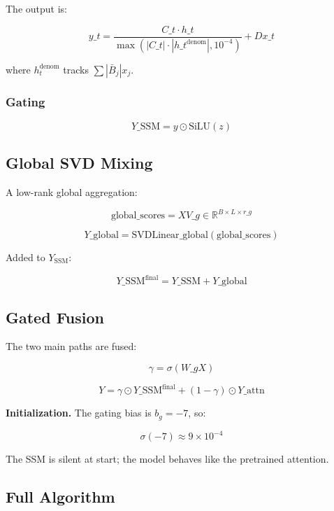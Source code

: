 The output is:

\[
y\_t = \frac{C\_t \cdot h\_t}{\max(|C\_t| \cdot |h\_t^\text{denom}|, 10^{-4})} + D x\_t
\tag{4.15}
\]

where $h_t^\text{denom}$ tracks $\sum |\bar{B}_j| x_j$.

\subsubsection{Gating}

\[
Y\_\text{SSM} = y \odot \text{SiLU}(z)
\tag{4.16}
\]

\subsection{Global SVD Mixing}

A low-rank global aggregation:

\[
\text{global}\_\text{scores} = X V\_g \in \mathbb{R}^{B \times L \times r\_g}
\tag{4.17}
\]

\[
Y\_\text{global} = \text{SVDLinear}\_\text{global}(\text{global}\_\text{scores})
\tag{4.18}
\]

Added to $Y_\text{SSM}$:

\[
Y\_\text{SSM}^\text{final} = Y\_\text{SSM} + Y\_\text{global}
\tag{4.19}
\]

\subsection{Gated Fusion}

The two main paths are fused:

\[
\gamma = \sigma(W\_g X)
\tag{4.20}
\]

\[
Y = \gamma \odot Y\_\text{SSM}^\text{final} + (1 - \gamma) \odot Y\_\text{attn}
\tag{4.21}
\]

\textbf{Initialization.} The gating bias is $b_g = -7$, so:

\[
\sigma(-7) \approx 9 \times 10^{-4}
\tag{4.22}
\]

The SSM is silent at start; the model behaves like the pretrained attention.

\subsection{Full Algorithm}

